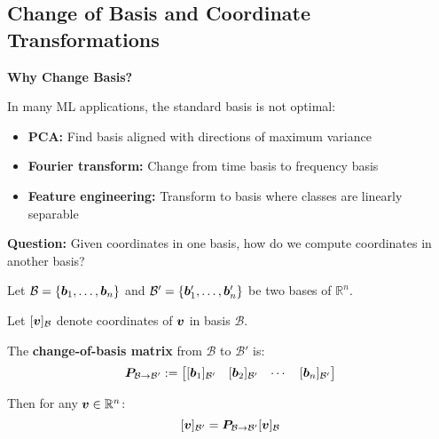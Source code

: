 \subsection{Change of Basis and Coordinate Transformations}

\begin{necessitybox}
    \textbf{Why Change Basis?}

    In many ML applications, the standard basis is not optimal:
    \begin{itemize}
        \item \textbf{PCA:} Find basis aligned with directions of maximum variance
        \item \textbf{Fourier transform:} Change from time basis to frequency basis
        \item \textbf{Feature engineering:} Transform to basis where classes are linearly separable
    \end{itemize}

    \textbf{Question:} Given coordinates in one basis, how do we compute coordinates in another basis?
\end{necessitybox}

\begin{theorem}
    \label{thm:change-of-basis}
    Let $\mathcal{B} = \{\bm{b}_1, \ldots, \bm{b}_n\}$ and $\mathcal{B}' = \{\bm{b}'_1, \ldots, \bm{b}'_n\}$ be two bases of $\mathbb{R}^n$.

    Let $[\bm{v}]_{\mathcal{B}}$ denote coordinates of $\bm{v}$ in basis
    $\mathcal{B}$.

    The \textbf{change-of-basis matrix} from $\mathcal{B}$ to $\mathcal{B}'$ is:
    \[
        \bm{P}_{\mathcal{B} \to \mathcal{B}'} := \begin{bmatrix} [\bm{b}_1]_{\mathcal{B}'} & [\bm{b}_2]_{\mathcal{B}'} & \cdots & [\bm{b}_n]_{\mathcal{B}'} \end{bmatrix}
    \]

    Then for any $\bm{v} \in \mathbb{R}^n$:
    \[
        [\bm{v}]_{\mathcal{B}'} = \bm{P}_{\mathcal{B} \to \mathcal{B}'} [\bm{v}]_{\mathcal{B}}
    \]
\end{theorem}

